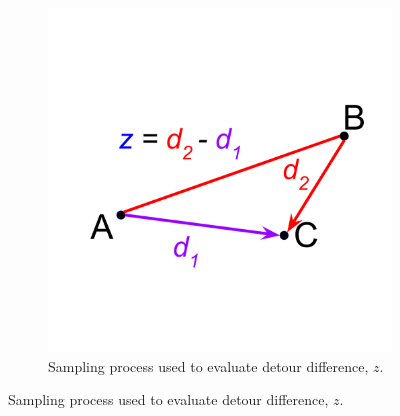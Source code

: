 \begin{figure}
\begin{center}

\begin{minipage}{\linewidth}
\begin{subfigure}[b]{\linewidth}
\begin{minipage}{0.5\textwidth}
\begin{center}
\includegraphics[width=\linewidth,trim=2cm 5cm 2cm 5cm, clip]{img/detour-difference}
\end{center}
\end{minipage}%
\begin{minipage}{0.5\textwidth}
\caption{
Sampling process used to evaluate detour difference, $z$.
} \label{fig:detour_difference_cartoon}
\end{minipage}
\end{subfigure}
\end{minipage}


\end{center}
\end{figure}
